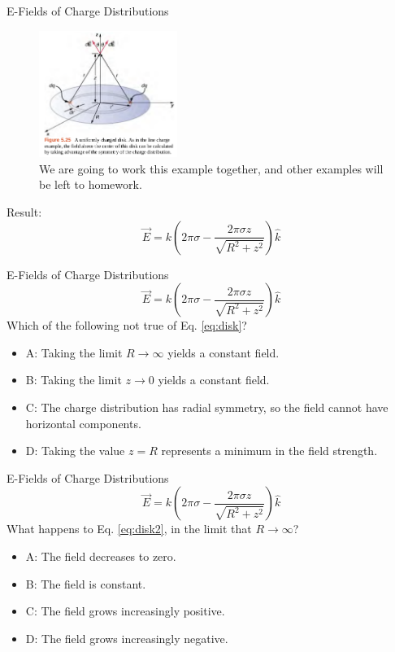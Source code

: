 \documentclass{beamer}
\begin{document}
\begin{frame}{E-Fields of Charge Distributions}
\begin{figure}
\includegraphics[width=0.4\textwidth]{figures/disk.png}
\caption{\label{fig:disk2} We are going to work this example together, and other examples will be left to homework.}
\end{figure}
Result:
\begin{equation}
\boxed{
\vec{E} = k\left(2\pi\sigma - \frac{2\pi\sigma z}{\sqrt{R^2 + z^2}} \right)\hat{k}}
\end{equation}
\end{frame}

\begin{frame}{E-Fields of Charge Distributions}
\begin{equation}
\boxed{
\vec{E} = k\left(2\pi\sigma - \frac{2\pi\sigma z}{\sqrt{R^2 + z^2}} \right)\hat{k}} \label{eq:disk}
\end{equation}
Which of the following not true of Eq. \ref{eq:disk}?
\begin{itemize}
\item A: Taking the limit $R \rightarrow \infty$ yields a constant field.
\item B: Taking the limit $z \rightarrow 0$ yields a constant field.
\item C: The charge distribution has radial symmetry, so the field cannot have horizontal components.
\item D: Taking the value $z = R$ represents a minimum in the field strength.
\end{itemize}
\end{frame}

\begin{frame}{E-Fields of Charge Distributions}
\begin{equation}
\boxed{
\vec{E} = k\left(2\pi\sigma - \frac{2\pi\sigma z}{\sqrt{R^2 + z^2}} \right)\hat{k}} \label{eq:disk2}
\end{equation}
What happens to Eq. \ref{eq:disk2}, in the limit that $R \rightarrow \infty$?
\begin{itemize}
\item A: The field decreases to zero.
\item B: The field is constant.
\item C: The field grows increasingly positive.
\item D: The field grows increasingly negative.
\end{itemize}
\end{frame}
\end{document}

